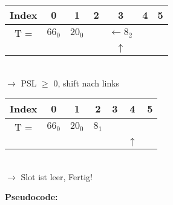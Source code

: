 \begin{multicols}{2}
\begin{center}
\begin{tabular}{|c|c|c|c|c|c|c|}
\hline
Index & 0 & 1 & 2 & 3 & 4 & 5\\
\hline
T = & $66_0$ & $20_0$ &  & $\leftarrow 8_2$ & &\\
\hline
&  &  &  & $\uparrow$ & &\\
\hline
\end{tabular}\\
$\rightarrow$ PSL $\geq$ 0, shift nach links\\
\end{center}

\begin{center}
\begin{tabular}{|c|c|c|c|c|c|c|}
\hline
Index & 0 & 1 & 2 & 3 & 4 & 5\\
\hline
T = & $66_0$ & $20_0$ & $8_1$ &  & &\\
\hline
&  &  &  &  & $\uparrow$ &\\
\hline
\end{tabular}\\
$\rightarrow$ Slot ist leer, Fertig!\\
\end{center}
\end{multicols}



\noindent
\textbf{Pseudocode:}